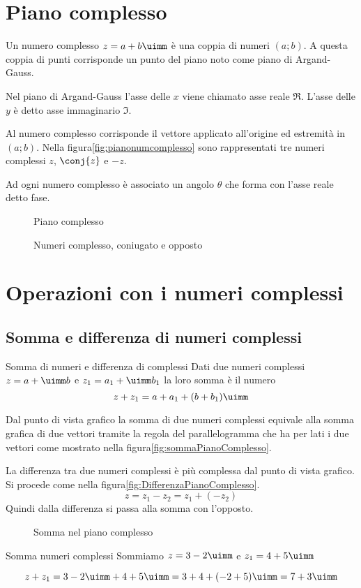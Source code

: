 \section{Piano complesso}
Un numero complesso $z=a+b\uimm$ è una coppia di numeri $(a;b)$. A questa 
coppia di punti corrisponde un punto del piano noto come piano di  
Argand-Gauss.\par  
Nel piano di Argand-Gauss l'asse delle $x$ viene chiamato asse reale $\Re$. 
L'asse delle $y$ è detto asse immaginario $\Im$.\par
Al numero complesso corrisponde il vettore applicato all'origine ed estremità 
in $(a;b)$. Nella figura\nobs\vref{fig:pianonumcomplesso} sono rappresentati 
tre numeri complessi $z$, $\conj{z}$ e $-z$.\par Ad ogni numero complesso è 
associato un angolo $\theta$ che forma con l'asse reale detto fase. 
\begin{figure}
	\centering
	
	\caption{Piano complesso}
	\label{fig:nuncomplPianoComplesso}
\end{figure}
\begin{figure} %
	\centering

	\caption{Numeri complesso, coniugato e opposto}
	\label{fig:pianonumcomplesso}
\end{figure}

\section{Operazioni con i numeri complessi}
\label{sec:NumCompOperazioni}
\subsection{Somma e differenza di numeri complessi}
\begin{definizionet}{Somma di numeri e differenza di complessi}{}
Dati due numeri complessi  $z=a+\uimm b$ e  $z_1=a_1+\uimm b_1$ la loro somma è il numero \[z+z_1=a+a_1+(b+b_1)\uimm\]
\end{definizionet}
Dal punto di vista grafico la somma di due numeri complessi equivale alla somma grafica di due vettori tramite la regola del parallelogramma che ha per lati i due vettori come mostrato nella figura\nobs\vref{fig:sommaPianoComplesso}.

La differenza tra due numeri complessi è più complessa dal punto di vista grafico. Si procede come nella figura\nobs\vref{fig:DifferenzaPianoComplesso}. \[ z=z_1-z_2=z_1+(-z_2)\]  Quindi dalla differenza si passa alla somma con l'opposto.
\begin{figure}
	\centering
	
	\caption{Somma nel piano complesso}
	\label{fig:sommaPianoComplesso}
\end{figure}
\begin{esempiot}{Somma numeri complessi}{}
Sommiamo $z=3-2\uimm$ e $z_1=4+5\uimm$
\end{esempiot}
	\[z+z_1=3-2\uimm +4+5\uimm=3+4+(-2+5)\uimm=7+3\uimm\]


